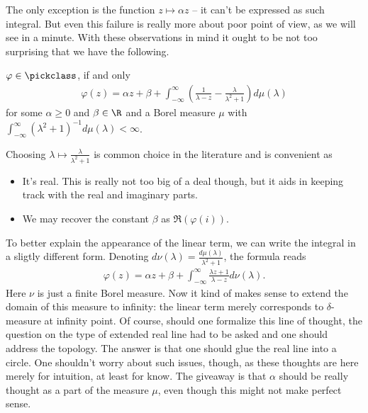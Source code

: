 The only exception is the function $z \mapsto \alpha z$ -- it can't be expressed as such integral. But even this failure is really more about poor point of view, as we will see in a minute. With these observations in mind it ought to be not too surprising that we have the following.

\begin{lause}\label{pick_nevanlinna_herglotz_representation_theorem}
	$\varphi \in \pickclass$, if and only
	\begin{align}\label{pick_representation}
		\varphi(z) = \alpha z + \beta + \int_{-\infty}^{\infty} \left(\frac{1}{\lambda - z} - \frac{\lambda}{\lambda^2 + 1}\right) d \mu(\lambda)
	\end{align}
	for some $\alpha \geq 0$ and $\beta \in \R$ and a Borel measure $\mu$ with $\int_{-\infty}^{\infty} (\lambda^2 + 1)^{-1} d \mu(\lambda) < \infty$.
\end{lause}

Choosing $\lambda \mapsto \frac{\lambda}{\lambda^2 + 1}$ is common choice in the literature and is convenient as
\begin{itemize}
	\item It's real. This is really not too big of a deal though, but it aids in keeping track with the real and imaginary parts.
	\item We may recover the constant $\beta$ as $\Re(\varphi(i))$.
\end{itemize}

To better explain the appearance of the linear term, we can write the integral in a sligtly different form. Denoting $d \nu(\lambda) = \frac{d \mu(\lambda)}{\lambda^2 + 1}$, the formula reads
\begin{align*}
	\varphi(z) = \alpha z + \beta + \int_{-\infty}^{\infty} \frac{\lambda z + 1}{\lambda - z} d \nu(\lambda).
\end{align*}
Here $\nu$ is just a finite Borel measure. Now it kind of makes sense to extend the domain of this measure to infinity: the linear term merely corresponds to $\delta$-measure at infinity point. Of course, should one formalize this line of thought, the question on the type of extended real line had to be asked and one should address the topology. The answer is that one should glue the real line into a circle. One shouldn't worry about such issues, though, as these thoughts are here merely for intuition, at least for know. The giveaway is that $\alpha$ should be really thought as a part of the measure $\mu$, even though this might not make perfect sense.

